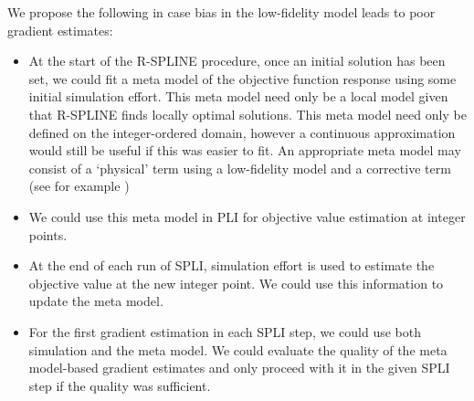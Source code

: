 \documentclass[12pt,a4paper]{article}
\begin{document}
We propose the following in case bias in the low-fidelity model leads to poor gradient estimates:
%
\begin{itemize}[noitemsep]
\item At the start of the R-SPLINE procedure, once an initial solution has been set, we could fit a meta model of the objective function response using some initial simulation effort. This meta model need only be a local model given that R-SPLINE finds locally optimal solutions. This meta model need only be defined on the integer-ordered domain, however a continuous approximation would still be useful if this was easier to fit. An appropriate meta model may consist of a `physical' term using a low-fidelity model and a corrective term (see for example \citet{osorio2015computationally})
  \item We could use this meta model in PLI for objective value estimation at integer points.
  \item At the end of each run of SPLI, simulation effort is used to estimate the objective value at the new integer point. We could use this information to update the meta model.
  \item For the first gradient estimation in each SPLI step, we could use both simulation and the meta model. We could evaluate the quality of the meta model-based gradient estimates and only proceed with it in the given SPLI step if the quality was sufficient. 
  \end{itemize}
  



\end{document}

